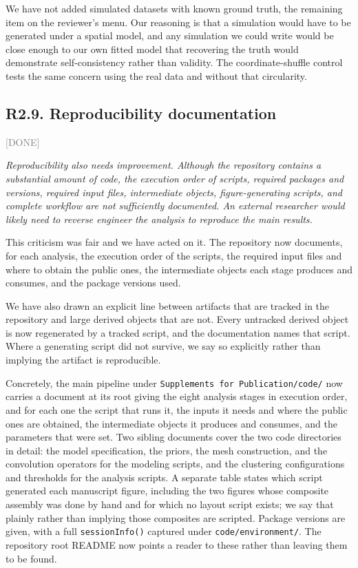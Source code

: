 \documentclass[11pt]{article}
\newcommand{\status}[1]{\textcolor{gray}{\small\textsf{[#1]}}}
\newenvironment{rev}{\begin{leftbar}\itshape\small}{\end{leftbar}}
\begin{document}
We have not added simulated datasets with known ground truth, the remaining item on the
reviewer's menu. Our reasoning is that a simulation would have to be generated under a
spatial model, and any simulation we could write would be close enough to our own fitted
model that recovering the truth would demonstrate self-consistency rather than validity.
The coordinate-shuffle control tests the same concern using the real data and without that
circularity.

\subsection{R2.9. Reproducibility documentation} \status{DONE}

\begin{rev}
Reproducibility also needs improvement. Although the repository contains a substantial
amount of code, the execution order of scripts, required packages and versions, required
input files, intermediate objects, figure-generating scripts, and complete workflow are not
sufficiently documented. An external researcher would likely need to reverse engineer the
analysis to reproduce the main results.
\end{rev}

\noindent This criticism was fair and we have acted on it. The repository now documents,
for each analysis, the execution order of the scripts, the required input files and where to
obtain the public ones, the intermediate objects each stage produces and consumes, and the
package versions used.

We have also drawn an explicit line between artifacts that are tracked in the repository and
large derived objects that are not. Every untracked derived object is now regenerated by a
tracked script, and the documentation names that script. Where a generating script did not
survive, we say so explicitly rather than implying the artifact is reproducible.

Concretely, the main pipeline under \texttt{Supplements for Publication/code/} now carries a
document at its root giving the eight analysis stages in execution order, and for each one
the script that runs it, the inputs it needs and where the public ones are obtained, the
intermediate objects it produces and consumes, and the parameters that were set. Two
sibling documents cover the two code directories in detail: the model specification, the
priors, the mesh construction, and the convolution operators for the modeling scripts, and
the clustering configurations and thresholds for the analysis scripts. A separate table
states which script generated each manuscript figure, including the two figures whose
composite assembly was done by hand and for which no layout script exists; we say that
plainly rather than implying those composites are scripted. Package versions are given, with
a full \texttt{sessionInfo()} captured under \texttt{code/environment/}. The repository root
README now points a reader to these rather than leaving them to be found.
\end{document}
